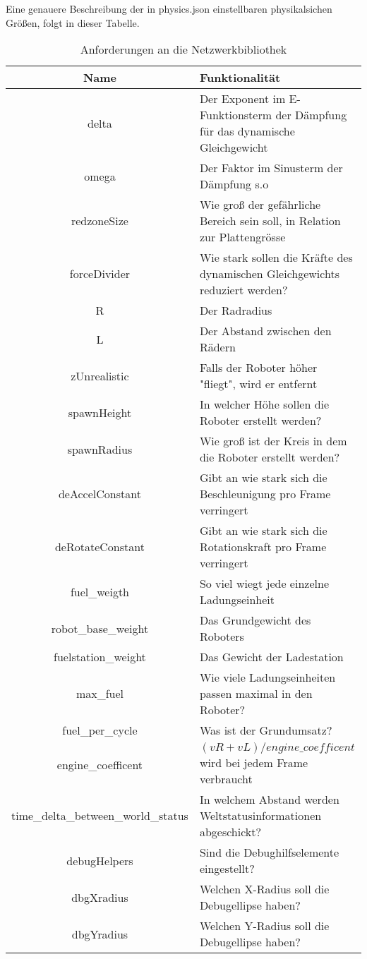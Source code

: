 \documentclass[
    12pt,
    bibliography=totoc,
    ngerman,
    enabledeprecatedfontcommands
]{scrartcl}
\begin{document}
Eine genauere Beschreibung der in physics.json einstellbaren physikalsichen Gr{\"{o}}{\ss}en, folgt in dieser Tabelle.
\begin{table}[h]
\centering
	\begin{tabular}{c | p{8cm}}
	\toprule
	Name & Funktionalit{\"{a}}t \\
	\midrule
	delta & Der Exponent im E-Funktionsterm der D{\"{a}}mpfung f{\"{u}}r das dynamische Gleichgewicht \\
	omega & Der Faktor im Sinusterm der D{\"{a}}mpfung s.o \\
	redzoneSize & Wie gro{\ss} der gef{\"{a}}hrliche Bereich sein soll, in Relation zur Plattengr{\"{o}}sse \\
	forceDivider & Wie stark sollen die Kr{\"{a}}fte des dynamischen Gleichgewichts reduziert werden? \\
	R & Der Radradius \\
	L & Der Abstand zwischen den R{\"{a}}dern \\
	zUnrealistic & Falls der Roboter h{\"{o}}her "fliegt", wird er entfernt \\
	spawnHeight & In welcher H{\"{o}}he sollen die Roboter erstellt werden? \\
	spawnRadius & Wie gro{\ss} ist der Kreis in dem die Roboter erstellt werden? \\
	deAccelConstant & Gibt an wie stark sich die Beschleunigung pro Frame verringert \\
	deRotateConstant & Gibt an wie stark sich die Rotationskraft pro Frame verringert \\
	fuel\_weigth & So viel wiegt jede einzelne Ladungseinheit\\
	robot\_base\_weight & Das Grundgewicht des Roboters \\
	fuelstation\_weight & Das Gewicht der Ladestation \\
	max\_fuel & Wie viele Ladungseinheiten passen maximal in den Roboter? \\
	fuel\_per\_cycle & Was ist der Grundumsatz? \\
	engine\_coefficent & $(vR + vL) / engine\_coefficent$ wird bei jedem Frame verbraucht \\
	time\_delta\_between\_world\_status & In welchem Abstand werden Weltstatusinformationen abgeschickt? \\
	debugHelpers & Sind die Debughilfselemente eingestellt? \\
	dbgXradius & Welchen X-Radius soll die Debugellipse haben? \\
	dbgYradius & Welchen Y-Radius soll die Debugellipse haben? \\
	\bottomrule
\end{tabular}
\caption{Anforderungen an die Netzwerkbibliothek}
\end{table}
\end{document}
